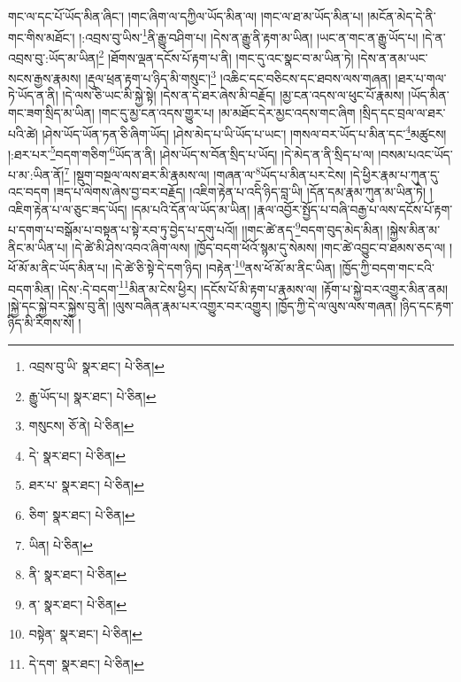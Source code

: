 གང་ལ་དང་པོ་ཡོད་མིན་ཞིང་། །གང་ཞིག་ལ་དཀྱིལ་ཡོད་མིན་ལ། །གང་ལ་ཐ་མ་ཡོད་མིན་པ། །མངོན་མེད་དེ་ནི་གང་གིས་མཐོང་། །:འབྲས་བུ་ཡིས་\footnote{འབྲས་བུ་ཡི་  སྣར་ཐང་།  པེ་ཅིན། }ནི་རྒྱུ་བཤིག་པ། །དེས་ན་རྒྱུ་ནི་རྟག་མ་ཡིན། །ཡང་ན་གང་ན་རྒྱུ་ཡོད་པ། །དེ་ན་འབྲས་བུ་:ཡོད་མ་ཡིན།\footnote{རྒྱུ་ཡོད་པ།  སྣར་ཐང་།  པེ་ཅིན། } །ཐོགས་ལྡན་དངོས་པོ་རྟག་པ་ནི། །གང་དུ་འང་སྣང་བ་མ་ཡིན་ཏེ། །དེས་ན་ནམ་ཡང་སངས་རྒྱས་རྣམས། །རྡུལ་ཕྲན་རྟག་པ་ཉིད་མི་གསུང་།\footnote{གསུངས།  ཅོ་ནེ།  པེ་ཅིན། } །འཆིང་དང་བཅིངས་དང་ཐབས་ལས་གཞན། །ཐར་པ་གལ་ཏེ་ཡོད་ན་ནི། །དེ་ལས་ཅི་ཡང་མི་སྐྱེ་སྟེ། །དེས་ན་དེ་ཐར་ཞེས་མི་བརྗོད། །མྱ་ངན་འདས་ལ་ཕུང་པོ་རྣམས། །ཡོད་མིན་གང་ཟག་སྲིད་མ་ཡིན། །གང་དུ་མྱ་ངན་འདས་གྱུར་པ། །མ་མཐོང་དེར་མྱང་འདས་གང་ཞིག །སྲིད་དང་བྲལ་ལ་ཐར་པའི་ཚེ། །ཤེས་ཡོད་ཡོན་ཏན་ཅི་ཞིག་ཡོད། །ཤེས་མེད་པ་ཡི་ཡོད་པ་ཡང་། །གསལ་བར་ཡོད་པ་མིན་དང་\footnote{དེ་  སྣར་ཐང་།  པེ་ཅིན། }མཚུངས། །:ཐར་པར་\footnote{ཐར་པ་  སྣར་ཐང་།  པེ་ཅིན། }བདག་གཅིག་\footnote{ཅིག་  སྣར་ཐང་།  པེ་ཅིན། }ཡོད་ན་ནི། །ཤེས་ཡོད་ས་བོན་སྲིད་པ་ཡོད། །དེ་མེད་ན་ནི་སྲིད་པ་ལ། །བསམ་པའང་ཡོད་པ་མ་:ཡིན་ནོ།\footnote{ཡིན།  པེ་ཅིན། } །སྡུག་བསྔལ་ལས་ཐར་མི་རྣམས་ལ། །གཞན་ལ་\footnote{ནི་  སྣར་ཐང་།  པེ་ཅིན། }ཡོད་པ་མིན་པར་ངེས། །དེ་ཕྱིར་རྣམ་པ་ཀུན་དུ་འང་བདག །ཟད་པ་ལེགས་ཞེས་བྱ་བར་བརྗོད། །འཇིག་རྟེན་པ་འདི་ཉིད་བླ་ཡི། །དོན་དམ་རྣམ་ཀུན་མ་ཡིན་ཏེ། །འཇིག་རྟེན་པ་ལ་ཅུང་ཟད་ཡོད། །དམ་པའི་དོན་ལ་ཡོད་མ་ཡིན། །རྣལ་འབྱོར་སྤྱོད་པ་བཞི་བརྒྱ་པ་ལས་དངོས་པོ་རྟག་པ་དགག་པ་བསྒོམ་པ་བསྟན་པ་སྟེ་རབ་ཏུ་བྱེད་པ་དགུ་པའོ།། །།གང་ཚེ་ནད་\footnote{ན་  སྣར་ཐང་།  པེ་ཅིན། }བདག་བུད་མེད་མིན། །སྐྱེས་མིན་མ་ནིང་མ་ཡིན་པ། །དེ་ཚེ་མི་ཤེས་འབའ་ཞིག་ལས། །ཁྱོད་བདག་ཕོའོ་སྙམ་དུ་སེམས། །གང་ཚེ་འབྱུང་བ་ཐམས་ཅད་ལ། །ཕོ་མོ་མ་ནིང་ཡོད་མིན་པ། །དེ་ཚེ་ཅི་སྟེ་དེ་དག་ཉིད། །བརྟེན་\footnote{བསྟེན་  སྣར་ཐང་།  པེ་ཅིན། }ནས་ཕོ་མོ་མ་ནིང་ཡིན། །ཁྱོད་ཀྱི་བདག་གང་ངའི་བདག་མིན། །དེས་:དེ་བདག་\footnote{དེ་དག་  སྣར་ཐང་།  པེ་ཅིན། }མིན་མ་ངེས་ཕྱིར། །དངོས་པོ་མི་རྟག་པ་རྣམས་ལ། །རྟོག་པ་སྐྱེ་བར་འགྱུར་མིན་ནམ། །སྐྱེ་དང་སྐྱེ་བར་སྐྱེས་བུ་ནི། །ལུས་བཞིན་རྣམ་པར་འགྱུར་བར་འགྱུར། །ཁྱོད་ཀྱི་དེ་ལ་ལུས་ལས་གཞན། །ཉིད་དང་རྟག་ཉིད་མི་རིགས་སོ། །

